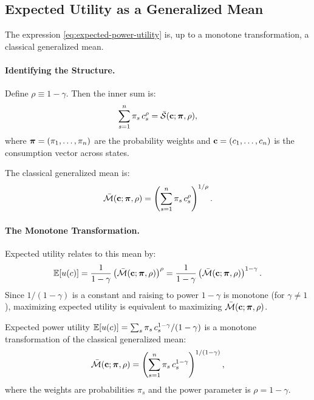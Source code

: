 \subsection{Expected Utility as a Generalized Mean}
\label{subsec:eu-as-mean}

The expression \cref{eq:expected-power-utility} is, up to a monotone transformation, a classical generalized mean.

\paragraph{Identifying the Structure.}
Define $\rho \equiv 1 - \gamma$. Then the inner sum is:
\begin{equation}
\sum_{s=1}^{n} \pi_s \, c_s^{\rho} = \bar{\mathcal{S}}(\mathbf{c}; \bm{\pi}, \rho),
\label{eq:inner-sum-risk}
\end{equation}
where $\bm{\pi} = (\pi_1, \ldots, \pi_n)$ are the probability weights and $\mathbf{c} = (c_1, \ldots, c_n)$ is the consumption vector across states.

The classical generalized mean is:
\begin{equation}
\bar{\mathcal{M}}(\mathbf{c}; \bm{\pi}, \rho) = \left( \sum_{s=1}^{n} \pi_s \, c_s^{\rho} \right)^{1/\rho}.
\label{eq:mean-risk}
\end{equation}

\paragraph{The Monotone Transformation.}
Expected utility relates to this mean by:
\begin{equation}
\mathbb{E}[u(c)] = \frac{1}{1-\gamma} \left( \bar{\mathcal{M}}(\mathbf{c}; \bm{\pi}, \rho) \right)^{\rho} = \frac{1}{1-\gamma} \left( \bar{\mathcal{M}}(\mathbf{c}; \bm{\pi}, \rho) \right)^{1-\gamma}.
\label{eq:eu-mean-relation}
\end{equation}
Since $1/(1-\gamma)$ is a constant and raising to power $1-\gamma$ is monotone (for $\gamma \neq 1$), maximizing expected utility is equivalent to maximizing $\bar{\mathcal{M}}(\mathbf{c}; \bm{\pi}, \rho)$.

\begin{proposition}
\label{prop:eu-as-mean}
Expected power utility $\mathbb{E}[u(c)] = \sum_s \pi_s \, c_s^{1-\gamma}/(1-\gamma)$ is a monotone transformation of the classical generalized mean:
\begin{equation}
\bar{\mathcal{M}}(\mathbf{c}; \bm{\pi}, \rho) = \left( \sum_{s=1}^{n} \pi_s \, c_s^{1-\gamma} \right)^{1/(1-\gamma)},
\end{equation}
where the weights are probabilities $\pi_s$ and the power parameter is $\rho = 1 - \gamma$.
\end{proposition}

